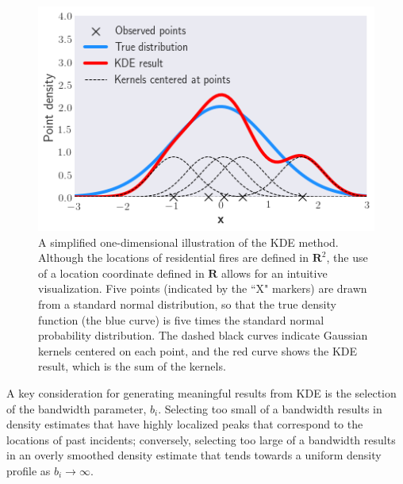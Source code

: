 \documentclass{svjour3}
\begin{document}
\begin{figure}[htb] \centering
\includegraphics[width=.5\textwidth]{./figures/1dkde.png}
\caption{A simplified one-dimensional illustration of the KDE method. Although the locations of residential fires are defined in $\textbf{R}^2$, the use of a location coordinate defined in $\textbf{R}$ allows for an intuitive visualization. Five points (indicated by the ``X" markers) are drawn from a standard normal distribution, so that the true density function (the blue curve) is five times the standard normal probability distribution. The dashed black curves indicate Gaussian kernels centered on each point, and the red curve shows the KDE result, which is the sum of the kernels.}
\label{fig:1dkde}
\end{figure}

A key consideration for generating meaningful results from KDE is the selection of the bandwidth parameter, $b_i$. Selecting too small of a bandwidth results in density estimates that have highly localized peaks that correspond to the locations of past incidents; conversely, selecting too large of a bandwidth results in an overly smoothed density estimate that tends towards a uniform density profile as $b_i \rightarrow  \infty$.













\clearpage


\end{document}
